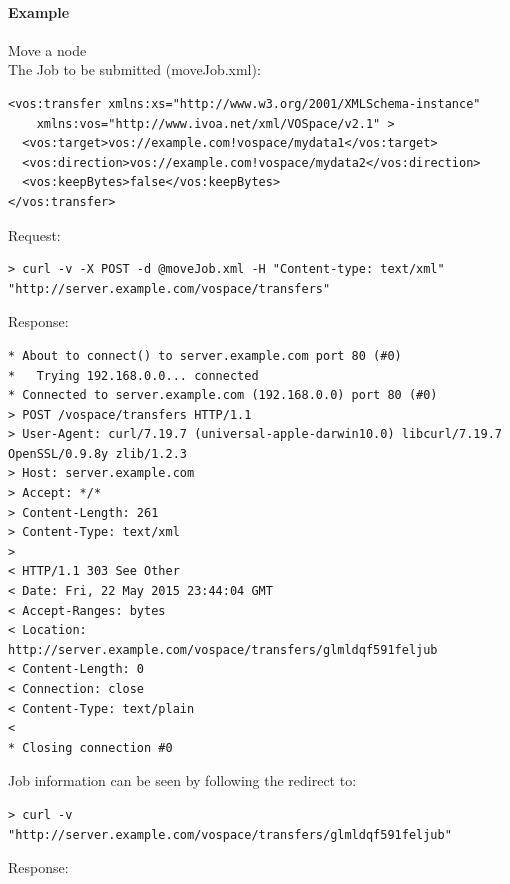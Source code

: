 \documentclass[11pt,a4paper]{ivoa}
\begin{document}
\paragraph{Example}
Move a node
\\[5px]
\noindent
The Job to be submitted (moveJob.xml):
\begin{lstlisting}
<vos:transfer xmlns:xs="http://www.w3.org/2001/XMLSchema-instance"
    xmlns:vos="http://www.ivoa.net/xml/VOSpace/v2.1" >
  <vos:target>vos://example.com!vospace/mydata1</vos:target>
  <vos:direction>vos://example.com!vospace/mydata2</vos:direction>
  <vos:keepBytes>false</vos:keepBytes>
</vos:transfer>
\end{lstlisting}
Request:
\begin{lstlisting}
> curl -v -X POST -d @moveJob.xml -H "Content-type: text/xml" "http://server.example.com/vospace/transfers"
\end{lstlisting}
Response:
\begin{lstlisting}
* About to connect() to server.example.com port 80 (#0)
*   Trying 192.168.0.0... connected
* Connected to server.example.com (192.168.0.0) port 80 (#0)
> POST /vospace/transfers HTTP/1.1
> User-Agent: curl/7.19.7 (universal-apple-darwin10.0) libcurl/7.19.7 OpenSSL/0.9.8y zlib/1.2.3
> Host: server.example.com
> Accept: */*
> Content-Length: 261
> Content-Type: text/xml
>
< HTTP/1.1 303 See Other
< Date: Fri, 22 May 2015 23:44:04 GMT
< Accept-Ranges: bytes
< Location: http://server.example.com/vospace/transfers/glmldqf591feljub
< Content-Length: 0
< Connection: close
< Content-Type: text/plain
<
* Closing connection #0
\end{lstlisting}
Job information can be seen by following the redirect to:
\begin{lstlisting}
> curl -v "http://server.example.com/vospace/transfers/glmldqf591feljub"
\end{lstlisting}
Response:
\end{document}
